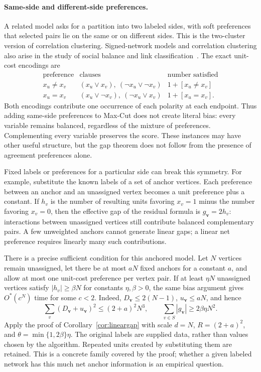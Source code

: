 \documentclass[11pt,a4paper]{article}
\theoremstyle{definition}
\theoremstyle{remark}
\newcommand{\Ostar}{O^{*}}
\begin{document}
\paragraph{Same-side and different-side preferences.}
A related model asks for a partition into two labeled sides, with soft
preferences that selected pairs lie on the same or on different sides.
This is the two-cluster version of correlation clustering. Signed-network
models and correlation clustering also arise in the study of social
balance and link classification~\cite{CBGV12}. The exact unit-cost encodings
are
\[
\begin{array}{c|c|c}
\text{preference}&\text{clauses}&\text{number satisfied}\\ \hline
 x_u\ne x_v &(x_u\vee x_v),\ (\neg x_u\vee\neg x_v)
     &1+[x_u\ne x_v]\\
 x_u=x_v &(x_u\vee\neg x_v),\ (\neg x_u\vee x_v)
     &1+[x_u=x_v].
\end{array}
\]
Both encodings contribute one occurrence of each polarity at each endpoint.
Thus adding same-side preferences to Max-Cut does not create literal bias:
every variable remains balanced, regardless of the mixture of preferences.
Complementing every variable preserves the score. These instances may have
other useful structure, but the gap theorem does not follow from the
presence of agreement preferences alone.

Fixed labels or preferences for a particular side can break this symmetry.
For example, substitute the known labels of a set of anchor vertices.
Each preference between an anchor and an unassigned vertex becomes a unit
preference plus a constant. If $h_v$ is the number of resulting units
favoring $x_v=1$ minus the number favoring $x_v=0$, then the effective gap
of the residual formula is $g_{\mathbf v}=2h_v$: interactions between unassigned
vertices still contribute balanced complementary pairs. A few unweighted
anchors cannot generate linear gaps; a linear net preference requires
linearly many such contributions.

There is a precise sufficient condition for this anchored model. Let $N$
vertices remain unassigned, let there be at most $aN$ fixed anchors for a
constant $a$, and allow at most one unit-cost preference per vertex pair.
If at least $\eta N$ unassigned vertices satisfy $|h_v|\ge\beta N$ for
constants $\eta,\beta>0$, the same bias argument gives $\Ostar(c^N)$ time
for some $c<2$. Indeed, $D_{\mathbf v}\le2(N-1)$, $u_{\mathbf v}\le aN$, and hence
\[
 \sum_v(D_{\mathbf v}+u_{\mathbf v})^2\le(2+a)^2N^3,
 \qquad
 \sum_{v\in S}|g_{\mathbf v}|\ge2\beta\eta N^2.
\]
Apply the proof of Corollary~\ref{cor:lineargap} with scale $d=N$,
$R=(2+a)^2$, and $\theta=\min\{1,2\beta\}\eta$.
The original labels are supplied data, rather than values chosen by the
algorithm. Repeated units created by substituting them are retained.
This is a concrete family covered by the proof; whether a given labeled
network has this much net anchor information is an empirical question.
\end{document}

